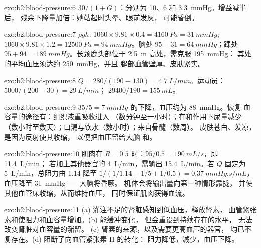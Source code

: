 \begin{solution}{exo:b2:blood-pressure:6}
$30/(1 + G)$：分别为 10、6 和 \qty{3.3}{mmHg}。增益减半后，
残余下降量加倍：她站起时头晕、眼前发灰，
可能昏倒。
\end{solution}

\begin{solution}{exo:b2:blood-pressure:7}
$\rho g h$: $1060\times 9.81\times 0.4 = \qty{4160}{Pa} =
\qty{31}{mmHg}$; $1060\times 9.81\times 1.2 = \qty{12500}{Pa} =
\qty{94}{mmHg}$。脑处 $95 - 31 = \qty{64}{mmHg}$；踝处 $95 + 94 =
\qty{189}{mmHg}$。长颈鹿头部位于 \qty{2.5}{m} 高处，需克服 \qty{195}{mmHg}：
其处的平均血压须达约 \qty{250}{mmHg}，并且
腿部血管壁厚、皮肤紧实。
\end{solution}

\begin{solution}{exo:b2:blood-pressure:8}
$Q = 280/(190 - 130) = \qty{4.7}{L/min}$。运动员：$5000/(200 - 30) =
\qty{29}{L/min}$； $\num{29400}/190 = \qty{155}{mL}$。
\end{solution}

\begin{solution}{exo:b2:blood-pressure:9}
$35/5 = \qty{7}{mmHg}$ 的下降，血压约为 \qty{88}{mmHg}。恢复
血容量的途径有：组织液重吸收进入
（数分钟至一小时）；在和作用下尿量减少
（数小时至数天）；口渴与饮水（数小时）；来自骨髓（数周）。
皮肤苍白、发凉，是因为反射使其收缩，
以便把血压留给大脑
和。
\end{solution}

\begin{solution}{exo:b2:blood-pressure:10}
肌肉在 $R = 0.5$ 时：$95/0.5 = \qty{190}{mL/s}$，即 \qty{11.4}{L/min}；
若加上其他器官的 \qty{4}{L/min}，需输出
\qty{15.4}{L/min}。若 $Q$ 固定为 \qty{5}{L/min}，总阻力由 1.14 降至
$1/(1/1.14 - 1/5 + 1/0.5) =
\qty{0.37}{mmHg.s/mL}$，血压降至 \qty{31}{mmHg}——大脑将昏厥。
机体会将输出量向第一种情形靠拢，
并使其他血管床收缩，从而维持血压，
同时保证肌肉获得血流。
\end{solution}

\begin{solution}{exo:b2:blood-pressure:11}
(a) 灌注不足的肾脏感知到低血压，释放肾素，
血管紧张素和使阻力和血容量增加。(b) 能缓冲变化，
但会重设到持续存在的水平，
无法改变肾脏对血容量的潴留。
(c) 肾素的来源，以及需要更高血压的器官，
均已不复存在。(d) 阻断了向血管紧张素 II 的转化：
阻力降低，减少，血压下降。
\end{solution}

